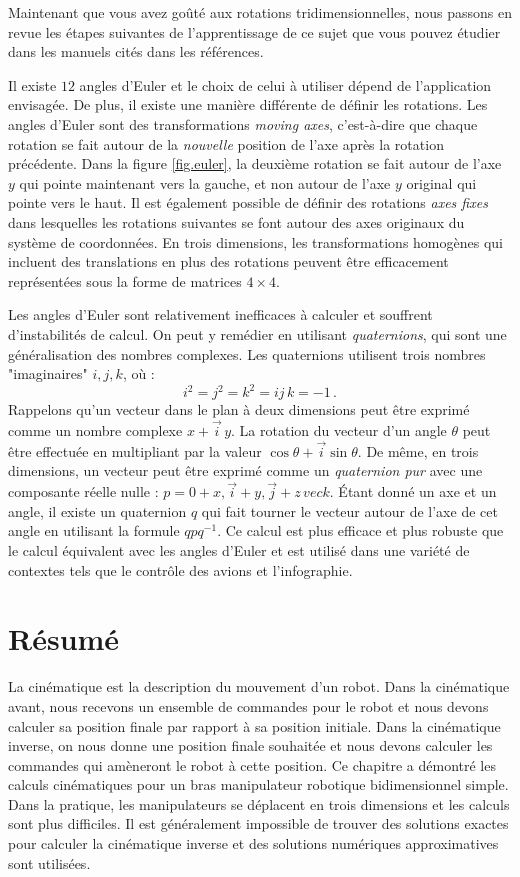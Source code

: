 Maintenant que vous avez goûté aux rotations tridimensionnelles, nous passons en revue les étapes suivantes de l'apprentissage de ce sujet que vous pouvez étudier dans les manuels cités dans les références.

Il existe $12$ angles d'Euler et le choix de celui à utiliser dépend de l'application envisagée. De plus, il existe une manière différente de définir les rotations. Les angles d'Euler sont des transformations \emph{moving axes}, c'est-à-dire que chaque rotation se fait autour de la \emph{nouvelle} position de l'axe après la rotation précédente. Dans la figure \ref{fig.euler}, la deuxième rotation se fait autour de l'axe $y$ qui pointe maintenant vers la gauche, et non autour de l'axe $y$ original qui pointe vers le haut. Il est également possible de définir des rotations \emph{axes fixes} dans lesquelles les rotations suivantes se font autour des axes originaux du système de coordonnées. En trois dimensions, les transformations homogènes qui incluent des translations en plus des rotations peuvent être efficacement représentées sous la forme de matrices $4\times 4$.

Les angles d'Euler sont relativement inefficaces à calculer et souffrent d'instabilités de calcul. On peut y remédier en utilisant \emph{quaternions}, qui sont une généralisation des nombres complexes. Les quaternions utilisent trois nombres "imaginaires" $i,j,k$, où :
\[
i^2 = j^2 = k^2 = ij\,k = -1\,.
\]
Rappelons qu'un vecteur dans le plan à deux dimensions peut être exprimé comme un nombre complexe $x+\vec{i}\,y$. La rotation du vecteur d'un angle $\theta$ peut être effectuée en multipliant par la valeur $\cos \theta + \vec{i} \sin \theta$.  De même, en trois dimensions, un vecteur peut être exprimé comme un \emph{quaternion pur} avec une composante réelle nulle : $p=0+x,\vec{i} + y,\vec{j} + z\,vec{k}$. Étant donné un axe et un angle, il existe un quaternion $q$ qui fait tourner le vecteur autour de l'axe de cet angle en utilisant la formule $qpq^{-1}$. Ce calcul est plus efficace et plus robuste que le calcul équivalent avec les angles d'Euler et est utilisé dans une variété de contextes tels que le contrôle des avions et l'infographie.


\section{Résumé}

La cinématique est la description du mouvement d'un robot. Dans la cinématique avant, nous recevons un ensemble de commandes pour le robot et nous devons calculer sa position finale par rapport à sa position initiale. Dans la cinématique inverse, on nous donne une position finale souhaitée et nous devons calculer les commandes qui amèneront le robot à cette position. Ce chapitre a démontré les calculs cinématiques pour un bras manipulateur robotique bidimensionnel simple. Dans la pratique, les manipulateurs se déplacent en trois dimensions et les calculs sont plus difficiles. Il est généralement impossible de trouver des solutions exactes pour calculer la cinématique inverse et des solutions numériques approximatives sont utilisées.

